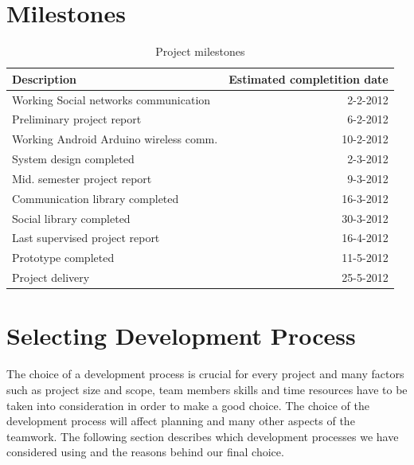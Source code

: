 \section{Milestones}
\begin{table}
	\begin{center}
		\caption{Project milestones}
		\begin{tabular}{| l | r |}
			\hline

\textbf{Description} & \textbf{Estimated completition date} \\
\hline

Working Social networks communication & 2-2-2012 \\
\hline

Preliminary project report & 6-2-2012 \\
\hline

Working Android Arduino wireless comm. & 10-2-2012 \\
\hline

System design completed & 2-3-2012 \\
\hline

Mid. semester project report & 9-3-2012 \\
\hline

Communication library completed & 16-3-2012 \\
\hline

Social library completed & 30-3-2012 \\
\hline

Last supervised project report & 16-4-2012 \\
\hline

Prototype completed & 11-5-2012 \\
\hline

Project delivery & 25-5-2012 \\
\hline

		\end{tabular}
	\end{center}
\label{table:milestone}
\end{table}


\newpage

\section{Selecting Development Process}
The choice of a development process is crucial for every project and many factors
such as project size and scope, team members skills and time resources have to be taken into
consideration in order to make a good choice. The choice of the development process will affect
planning and many other aspects of the teamwork. The following section describes
which development processes we have considered using and the reasons behind our final choice.

